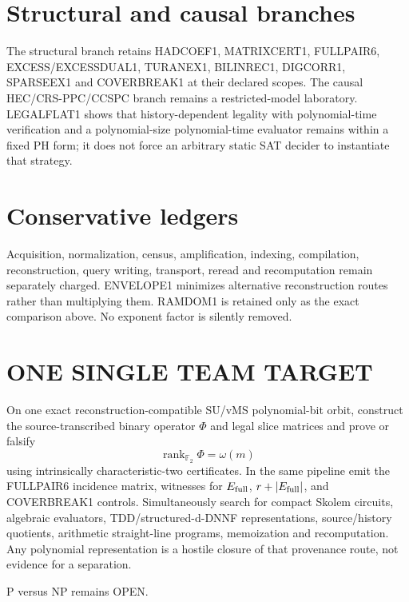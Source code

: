 \documentclass[11pt]{article}
\begin{document}
\section*{Structural and causal branches}
The structural branch retains HADCOEF1, MATRIXCERT1, FULLPAIR6, EXCESS/EXCESSDUAL1, TURANEX1, BILINREC1, DIGCORR1, SPARSEEX1 and COVERBREAK1 at their declared scopes. The causal HEC/CRS-PPC/CCSPC branch remains a restricted-model laboratory. LEGALFLAT1 shows that history-dependent legality with polynomial-time verification and a polynomial-size polynomial-time evaluator remains within a fixed PH form; it does not force an arbitrary static SAT decider to instantiate that strategy.

\section*{Conservative ledgers}
Acquisition, normalization, census, amplification, indexing, compilation, reconstruction, query writing, transport, reread and recomputation remain separately charged. ENVELOPE1 minimizes alternative reconstruction routes rather than multiplying them. RAMDOM1 is retained only as the exact comparison above. No exponent factor is silently removed.

\section*{ONE SINGLE TEAM TARGET}
On one exact reconstruction-compatible SU/vMS polynomial-bit orbit, construct the source-transcribed binary operator \(\Phi\) and legal slice matrices and prove or falsify
\[
\boxed{\operatorname{rank}_{\mathbb F_2}\Phi=\omega(m)}
\]
using intrinsically characteristic-two certificates. In the same pipeline emit the FULLPAIR6 incidence matrix, witnesses for \(E_{\rm full}\), \(r+|E_{\rm full}|\), and COVERBREAK1 controls. Simultaneously search for compact Skolem circuits, algebraic evaluators, TDD/structured-d-DNNF representations, source/history quotients, arithmetic straight-line programs, memoization and recomputation. Any polynomial representation is a hostile closure of that provenance route, not evidence for a separation.

P versus NP remains OPEN.
\end{document}
